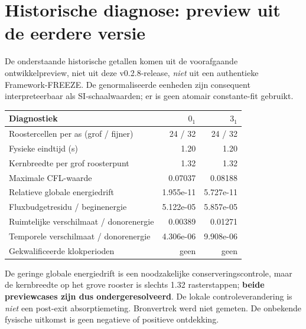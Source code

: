 \documentclass[10pt,a4paper]{article}
\begin{document}
\section{Historische diagnose: preview uit de eerdere versie}
De onderstaande historische getallen komen uit de voorafgaande ontwikkelpreview, niet uit deze v0.2.8-release, \emph{niet} uit een authentieke Framework-FREEZE. De genormaliseerde eenheden zijn consequent interpreteerbaar als SI-schaalwaarden; er is geen atomair constante-fit gebruikt.
\begin{center}\begin{tabular}{lrr}\toprule
Diagnostiek & $0_1$ & $3_1$\\\midrule
Roostercellen per as (grof / fijner) & 24 / 32 & 24 / 32\\
Fysieke eindtijd (s) & 1.20 & 1.20\\
Kernbreedte per grof roosterpunt & 1.32 & 1.32\\
Maximale CFL-waarde & 0.07037 & 0.08188\\
Relatieve globale energiedrift & 1.955e-11 & 5.727e-11\\
Fluxbudgetresidu / beginenergie & 5.122e-05 & 5.857e-05\\
Ruimtelijke verschilmaat / donorenergie & 0.00389 & 0.01271\\
Temporele verschilmaat / donorenergie & 4.306e-06 & 9.908e-06\\
Gekwalificeerde klokperioden & geen & geen\\\bottomrule
\end{tabular}\end{center}
De geringe globale energiedrift is een noodzakelijke conserveringscontrole, maar de kernbreedte op het grove rooster is slechts 1.32 rasterstappen; \textbf{beide previewcases zijn dus ondergeresolveerd}. De lokale controleverandering is \emph{niet} een post-exit absorptiemeting. Bronvertrek werd niet gemeten. De onbekende fysische uitkomst is geen negatieve of positieve ontdekking.
\end{document}
